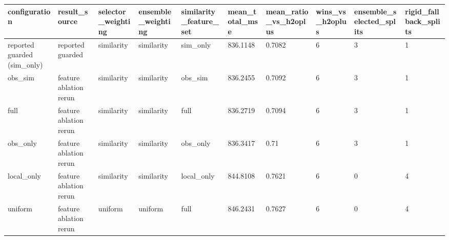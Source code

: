 \begin{tabular}{llllllllll}
\toprule
configuration & result\_source & selector\_weighting & ensemble\_weighting & similarity\_feature\_set & mean\_total\_mse & mean\_ratio\_vs\_h2oplus & wins\_vs\_h2oplus & ensemble\_selected\_splits & rigid\_fallback\_splits \\
\midrule
reported guarded (sim\_only) & reported guarded & similarity & similarity & sim\_only & 836.1148 & 0.7082 & 6 & 3 & 1 \\
obs\_sim & feature ablation rerun & similarity & similarity & obs\_sim & 836.2455 & 0.7092 & 6 & 3 & 1 \\
full & feature ablation rerun & similarity & similarity & full & 836.2719 & 0.7094 & 6 & 3 & 1 \\
obs\_only & feature ablation rerun & similarity & similarity & obs\_only & 836.3417 & 0.71 & 6 & 3 & 1 \\
local\_only & feature ablation rerun & similarity & similarity & local\_only & 844.8108 & 0.7621 & 6 & 0 & 4 \\
uniform & feature ablation rerun & uniform & uniform & full & 846.2431 & 0.7627 & 6 & 0 & 4 \\
\bottomrule
\end{tabular}
